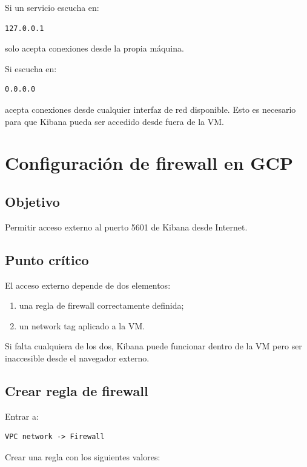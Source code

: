 \documentclass[
  coursetitle={Cómputo Nube y Tecnologías Emergentes},
  coursehours={96},
  coursedate={Verano 2026},
  doctype={Práctica},
  otherlangs={english,french},
  authorname={Lázaro},
  authorsurname={Bustio-Martínez},
  authortitle={PhD},
  role={Profesor Investigador},
  email={lbustio@inaoe.mx},
  phone={5559504000},
  ext={7459},
  institution={Instituto Nacional de Astrofísica, Óptica y Electrónica (INAOE)},
  department={Maestría en Ciencias en Tecnologías de Seguridad},
  address={Luis Enrique Erro 1, Sta. Ma. Tonantzintla, San Andrés Cholula, CP 72840, Puebla, México},
  margin={0.5in}
]{../../lbustio_lecture_notes}
\begin{document}
Si un servicio escucha en:

\begin{verbatim}
127.0.0.1
\end{verbatim}

solo acepta conexiones desde la propia máquina.

Si escucha en:

\begin{verbatim}
0.0.0.0
\end{verbatim}

acepta conexiones desde cualquier interfaz de red disponible. Esto es necesario para que Kibana pueda ser accedido desde fuera de la VM.

\section{Configuración de firewall en GCP}

\subsection{Objetivo}

Permitir acceso externo al puerto 5601 de Kibana desde Internet.

\subsection{Punto crítico}

El acceso externo depende de dos elementos:

\begin{enumerate}
    \item una regla de firewall correctamente definida;
    \item un network tag aplicado a la VM.
\end{enumerate}

Si falta cualquiera de los dos, Kibana puede funcionar dentro de la VM pero ser inaccesible desde el navegador externo.

\subsection{Crear regla de firewall}

Entrar a:

\begin{verbatim}
VPC network -> Firewall
\end{verbatim}

Crear una regla con los siguientes valores:
\end{document}
